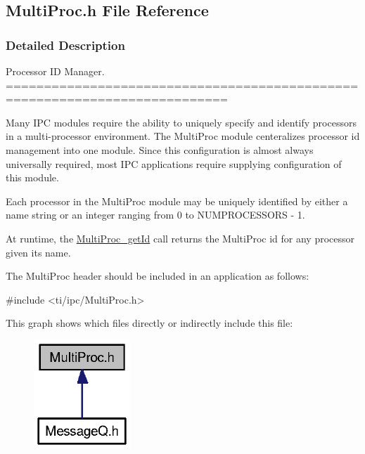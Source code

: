 \subsection{MultiProc.h File Reference}
\label{_multi_proc_8h}


\subsubsection{Detailed Description}
Processor ID Manager. ===========================================================================

Many IPC modules require the ability to uniquely specify and identify processors in a multi-\/processor environment. The MultiProc module centeralizes processor id management into one module. Since this configuration is almost always universally required, most IPC applications require supplying configuration of this module.

Each processor in the MultiProc module may be uniquely identified by either a name string or an integer ranging from 0 to NUMPROCESSORS -\/ 1.

At runtime, the \hyperlink{_multi_proc_8h_ad690d4b42978e95cb57d9244bb8e6959}{MultiProc\_\-getId} call returns the MultiProc id for any processor given its name.

The MultiProc header should be included in an application as follows: 
\begin{DoxyCode}
  #include <ti/ipc/MultiProc.h>
\end{DoxyCode}
 This graph shows which files directly or indirectly include this file:
\nopagebreak
\begin{figure}[H]
\begin{center}
\leavevmode
\includegraphics[width=103pt]{_multi_proc_8h__dep__incl}
\end{center}
\end{figure}
